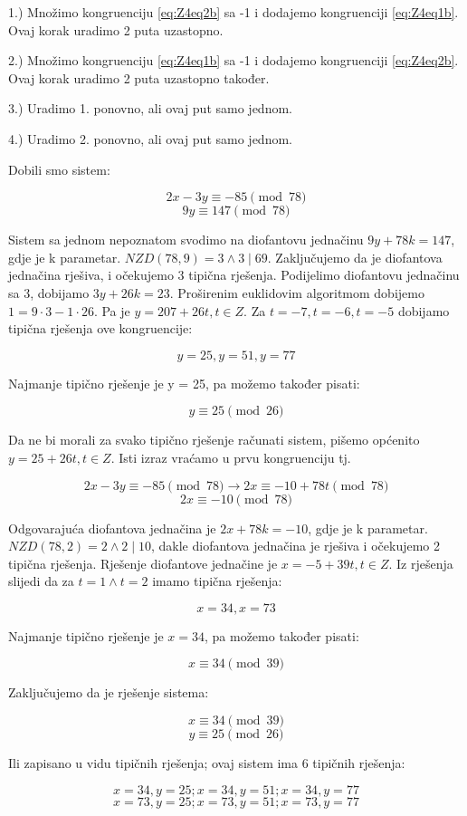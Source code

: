 \documentclass[12pt]{article}
\begin{document}
\begin{center}
1.) Množimo kongruenciju \ref{eq:Z4eq2b} sa -1 i dodajemo kongruenciji \ref{eq:Z4eq1b}. Ovaj korak uradimo 2 puta uzastopno.


2.) Množimo kongruenciju \ref{eq:Z4eq1b} sa -1 i dodajemo kongruenciji \ref{eq:Z4eq2b}. Ovaj korak uradimo 2 puta uzastopno također.


3.) Uradimo 1. ponovno, ali ovaj put samo jednom.


4.) Uradimo 2. ponovno, ali ovaj put samo jednom.
\end{center}

Dobili smo sistem:

$$2x - 3y \equiv -85 \pmod{78}$$
$$9y \equiv 147 \pmod{78}$$\vspace{1mm}

Sistem sa jednom nepoznatom svodimo na diofantovu jednačinu $9y + 78k = 147$, gdje je k parametar. $NZD(78, 9) = 3 \land 3 \mid 69$. Zaključujemo da je diofantova jednačina rješiva, i očekujemo 3 tipična rješenja. Podijelimo diofantovu jednačinu sa 3, dobijamo $3y + 26k = 23$. Proširenim euklidovim algoritmom dobijemo $1 = 9 \cdot 3 - 1 \cdot 26$. Pa je $y = 207 + 26t, t \in Z$. Za $t = -7, t = -6, t = -5$ dobijamo tipična rješenja ove kongruencije:

$$y = 25, y = 51, y = 77$$\vspace{1mm}

Najmanje tipično rješenje je y = 25, pa možemo također pisati:

$$y \equiv 25 \pmod{26}$$ \vspace{1mm}

Da ne bi morali za svako tipično rješenje računati sistem, pišemo općenito $y = 25 + 26t, t \in Z$. Isti izraz vraćamo u prvu kongruenciju tj.

$$2x - 3y \equiv -85 \pmod{78} \to 2x \equiv -10 + 78t \pmod{78}$$
$$2x \equiv -10 \pmod{78}$$\vspace{1mm}

Odgovarajuća diofantova jednačina je $2x + 78k = -10$, gdje je k parametar. $NZD(78, 2) = 2 \land 2 \mid 10$, dakle diofantova jednačina je rješiva i očekujemo 2 tipična rješenja. Rješenje diofantove jednačine je $x = -5 + 39t, t \in Z$. Iz rješenja slijedi da za $t = 1 \land t = 2$ imamo tipična rješenja:

$$x = 34, x = 73$$\vspace{1mm}

Najmanje tipično rješenje je $x = 34$, pa možemo također pisati:

$$x \equiv 34 \pmod{39}$$\vspace{1mm}

Zaključujemo da je rješenje sistema:

$$x \equiv 34 \pmod{39}$$
$$y \equiv 25 \pmod{26}$$\vspace{1mm}

Ili zapisano u vidu tipičnih rješenja; ovaj sistem ima 6 tipičnih rješenja:

$$x = 34, y = 25; x = 34, y = 51; x = 34, y = 77$$
$$x = 73, y = 25; x = 73, y = 51; x = 73, y = 77$$
\end{document}
